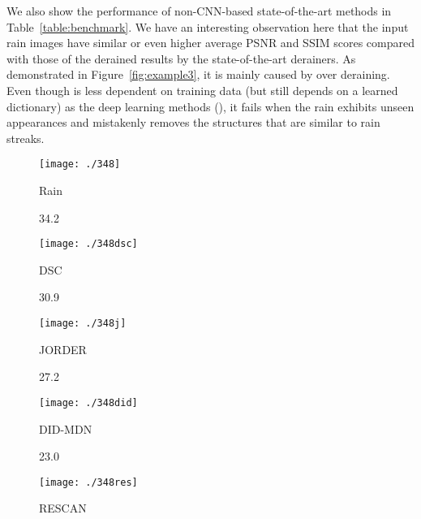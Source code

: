 \documentclass[10pt,twocolumn,letterpaper]{article}
\begin{document}
We also show the performance of non-CNN-based state-of-the-art methods in Table~\ref{table:benchmark}.
We have an interesting observation here that the input rain images have similar or even higher average PSNR and SSIM scores compared with those of the derained results by the state-of-the-art derainers. As demonstrated in Figure~\ref{fig:example3}, it is mainly caused by over deraining. Even though \cite{luo:iccv:2015:dsc} is less dependent on training data (but still depends on a learned dictionary) as the deep learning methods (\cite{yang:cvpr:2017:j,zhang:cvpr:2018:did,li:eccv:2018:rsecan}), it fails when the rain exhibits unseen appearances and mistakenly removes the structures that are similar to rain streaks.


\begin{figure}[ht]
	\centering
		\begin{minipage}[t]{0.15\linewidth}
		\texttt{[image: ./348]}\vspace{-0.08in}
		\vspace{-0.08in}\centerline{\tiny Rain}
		\centerline{\tiny 34.2}
		\end{minipage}
		\begin{minipage}[t]{0.15\linewidth}
		\texttt{[image: ./348dsc]}\vspace{-0.08in}
		\vspace{-0.08in} \centerline{\tiny DSC {\cite{luo:iccv:2015:dsc}}}
		\centerline{\tiny 30.9}
		\end{minipage}
		\begin{minipage}[t]{0.15\linewidth}
		\texttt{[image: ./348j]}\vspace{-0.08in}
		\vspace{-0.08in} \centerline{\tiny JORDER {\cite{yang:cvpr:2017:j}}}
		\centerline{\tiny 27.2}
		\end{minipage}
		\begin{minipage}[t]{0.15\linewidth}
		\texttt{[image: ./348did]}\vspace{-0.08in}
		\vspace{-0.08in} \centerline{\tiny DID-MDN {\cite{zhang:cvpr:2018:did}}}
		\centerline{\tiny 23.0}
		\end{minipage}
		\begin{minipage}[t]{0.15\linewidth}
		\texttt{[image: ./348res]}\vspace{-0.08in}
		\vspace{-0.08in}\centerline{\tiny RESCAN {\cite{li:eccv:2018:rsecan}}}

\end{minipage}
\end{figure}
\end{document}
